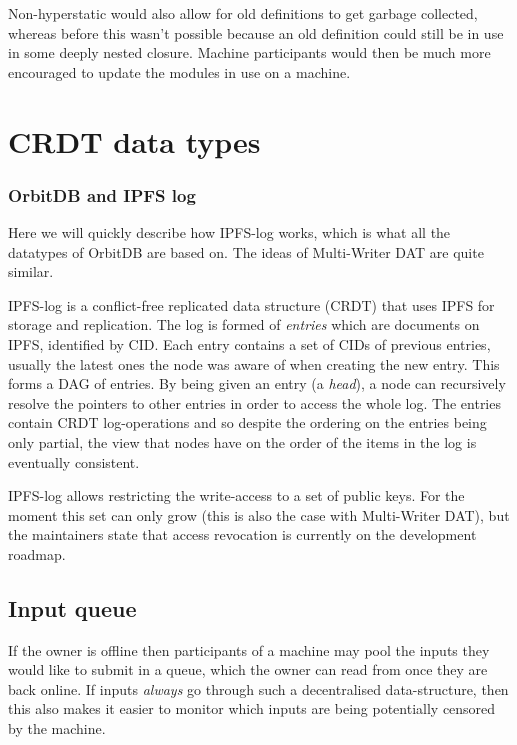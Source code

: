 \documentclass[a4paper, oneside, 10pt]{amsart}
\begin{document}
Non-hyperstatic would also allow for old definitions to get garbage
collected, whereas before this wasn't possible because an old definition
could still be in use in some deeply nested closure. Machine
participants would then be much more encouraged to update the modules in
use on a machine.

\section{CRDT data types}

\subsubsection{OrbitDB and IPFS log}

Here we will quickly describe how IPFS-log works, which is what all the
datatypes of OrbitDB are based on. The ideas of Multi-Writer DAT are quite
similar.

IPFS-log is a conflict-free replicated data structure (CRDT) that uses IPFS for
storage and replication. The log is formed of \emph{entries} which are documents
on IPFS, identified by CID. Each entry contains a set of CIDs of previous
entries, usually the latest ones the node was aware of when creating the new
entry. This forms a DAG of entries. By being given an entry (a \emph{head}), a
node can recursively resolve the pointers to other entries in order to access
the whole log. The entries contain CRDT log-operations and so despite the
ordering on the entries being only partial, the view that nodes have on the
order of the items in the log is eventually consistent.

IPFS-log allows restricting the write-access to a set of public keys. For the
moment this set can only grow (this is also the case with Multi-Writer DAT), but
the maintainers state that access revocation is currently on the development
roadmap.

\subsection{Input queue}

If the owner is offline then participants of a machine may pool the inputs they
would like to submit in a queue, which the owner can read from once they are
back online. If inputs \emph{always} go through such a decentralised
data-structure, then this also makes it easier to monitor which inputs are being
potentially censored by the machine.
\end{document}
